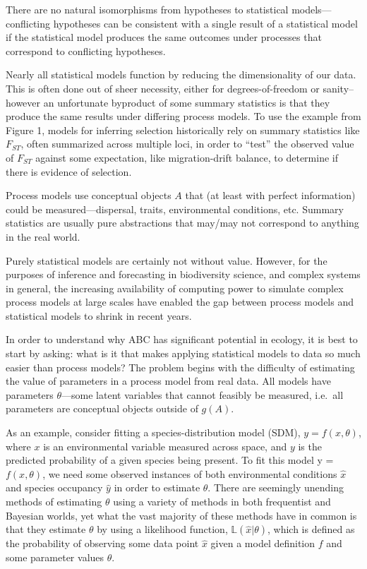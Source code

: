 There are no natural isomorphisms from hypotheses to statistical
models---conflicting hypotheses can be consistent with a single result
of a statistical model if the statistical model produces the same
outcomes under processes that correspond to conflicting hypotheses.

Nearly all statistical models function by reducing the dimensionality of
our data. This is often done out of sheer necessity, either for
degrees-of-freedom or sanity--however an unfortunate byproduct of some
summary statistics is that they produce the same results under differing
process models. To use the example from Figure 1, models for inferring
selection historically rely on summary statistics like \(F_{ST}\), often
summarized across multiple loci, in order to ``test'' the observed value
of \(F_{ST}\) against some expectation, like migration-drift balance, to
determine if there is evidence of selection.

Process models use conceptual objects \(A\) that (at least with perfect
information) could be measured---dispersal, traits, environmental
conditions, etc. Summary statistics are usually pure abstractions that
may/may not correspond to anything in the real world.

Purely statistical models are certainly not without value. However, for
the purposes of inference and forecasting in biodiversity science, and
complex systems in general, the increasing availability of computing
power to simulate complex process models at large scales have enabled
the gap between process models and statistical models to shrink in
recent years.

In order to understand why ABC has significant potential in ecology, it
is best to start by asking: what is it that makes applying statistical
models to data so much easier than process models? The problem begins
with the difficulty of estimating the value of parameters in a process
model from real data. All models have parameters \(\theta\)---some
latent variables that cannot feasibly be measured, i.e.~all parameters
are conceptual objects outside of \(g(A)\).

As an example, consider fitting a species-distribution model (SDM),
\(y = f(x, \theta)\), where \(x\) is an environmental variable measured
across space, and \(y\) is the predicted probability of a given species
being present. To fit this model y = \(f(x, \theta)\), we need some
observed instances of both environmental conditions \(\hat{x}\) and
species occupancy \(\hat{y}\) in order to estimate \(\theta\). There are
seemingly unending methods of estimating \(\theta\) using a variety of
methods in both frequentist and Bayesian worlds, yet what the vast
majority of these methods have in common is that they estimate
\(\theta\) by using a likelihood function,
\(\mathbb{L}(\hat{x} | \theta)\), which is defined as the probability of
observing some data point \(\hat{x}\) given a model definition \(f\) and
some parameter values \(\theta\).

